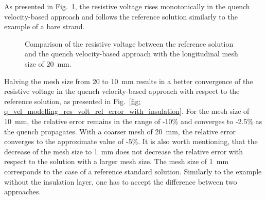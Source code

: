 As presented in Fig.~\ref{fig: q_vel_modelling_res_volt_benchmarking_with_insulation}, the resistive voltage rises monotonically in the quench velocity-based approach and follows the reference solution similarly to the example of a bare strand. 

\begin{figure}[H]
\centering
    \caption{Comparison of the resistive voltage between the reference solution and the quench velocity-based approach with the longitudinal mesh size of 20~mm.}
    \label{fig: q_vel_modelling_res_volt_benchmarking_with_insulation}
\end{figure}

Halving the mesh size from 20 to 10~mm results in a better convergence of the resistive voltage in the quench velocity-based approach with respect to the reference solution, as presented in Fig.~\ref{fig: q_vel_modelling_res_volt_rel_error_with_insulation}. For the mesh size of 10~mm, the relative error remains in the range of -10\% and converges to -2.5\% as the quench propagates. With a coarser mesh of 20~mm, the relative error converges to the approximate value of -5\%. It is also worth mentioning, that the decrease of the mesh size to 1~mm does not decrease the relative error with respect to the solution with a larger mesh size. The mesh size of 1~mm corresponds to the case of a reference standard solution. Similarly to the example without the insulation layer, one has to accept the difference between two approaches.


